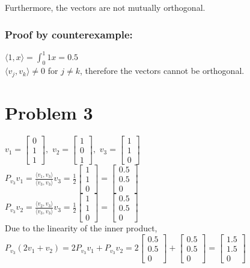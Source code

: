 \documentclass[fleqn]{article}
\begin{document}
\noindent Furthermore, the vectors are not mutually orthogonal.
\subsubsection*{Proof by counterexample:}
$\langle 1,x\rangle = \int_{0}^{1}1x=0.5$\\
$\langle v_j,v_k\rangle\neq 0 $ for $ j\neq k$, therefore the vectors cannot be orthogonal.
\pagebreak

\section*{Problem 3}
$v_1= \begin{bmatrix}0\\1\\1\end{bmatrix},$  $v_2= \begin{bmatrix}1\\0\\1\end{bmatrix},$  $v_3= \begin{bmatrix}1\\1\\0\end{bmatrix}$\\
$P_{v_3}v_1=\frac{\langle v_1,v_3 \rangle}{\langle v_3,v_3 \rangle}v_3=\frac{1}{2} \begin{bmatrix}1\\1\\0\end{bmatrix} = \begin{bmatrix}0.5\\0.5\\0\end{bmatrix}$\\
$P_{v_3}v_2=\frac{\langle v_2,v_3 \rangle}{\langle v_3,v_3 \rangle}v_3=\frac{1}{2} \begin{bmatrix}1\\1\\0\end{bmatrix} = \begin{bmatrix}0.5\\0.5\\0\end{bmatrix}$\\
Due to the linearity of the inner product,\\
$P_{v_3}(2v_1+v_2)=2P_{v_3}v_1+P_{v_3}v_2=2\begin{bmatrix}0.5\\0.5\\0\end{bmatrix}+\begin{bmatrix}0.5\\0.5\\0\end{bmatrix}=\begin{bmatrix}1.5\\1.5\\0\end{bmatrix}$
\end{document}
